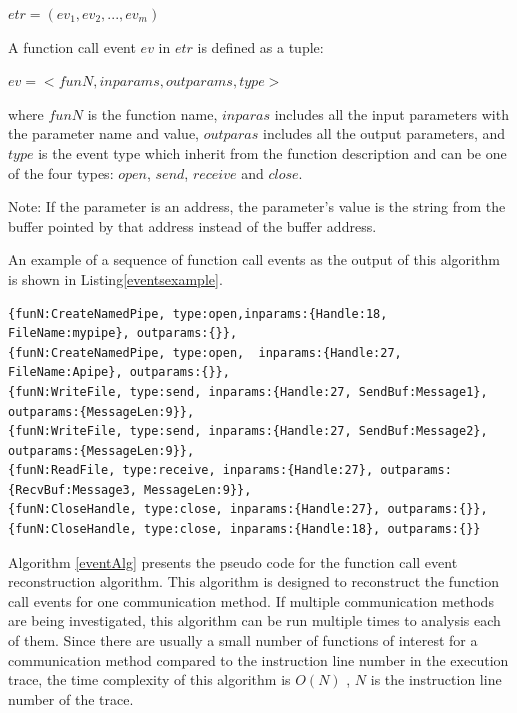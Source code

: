 $etr = (ev_1, ev_2, ..., ev_m)$

A function call event $ev$ in $etr$ is defined as a tuple:

$ev = <funN, inparams, outparams, type>$

where $funN$ is the function name, $inparas$ includes all the input parameters with the parameter name and value, $outparas$ includes all the output parameters, and $type$ is the event type which inherit from the function description and can be one of the four types: $open$, $send$, $receive$ and $close$.

Note: If the parameter is an address, the parameter's value is the string from the buffer pointed by that address instead of the buffer address.

An example of a sequence of function call events as the output of this algorithm is shown in Listing\ref{eventsexample}.

\begin{lstlisting}[caption= Example of  $etr$, label=eventsexample]
{funN:CreateNamedPipe, type:open,inparams:{Handle:18, FileName:mypipe}, outparams:{}},
{funN:CreateNamedPipe, type:open,  inparams:{Handle:27,  FileName:Apipe}, outparams:{}},
{funN:WriteFile, type:send, inparams:{Handle:27, SendBuf:Message1}, outparams:{MessageLen:9}},
{funN:WriteFile, type:send, inparams:{Handle:27, SendBuf:Message2}, outparams:{MessageLen:9}},
{funN:ReadFile, type:receive, inparams:{Handle:27}, outparams:{RecvBuf:Message3, MessageLen:9}},
{funN:CloseHandle, type:close, inparams:{Handle:27}, outparams:{}},
{funN:CloseHandle, type:close, inparams:{Handle:18}, outparams:{}}
\end{lstlisting}

Algorithm \ref{eventAlg} presents the pseudo code for the function call event reconstruction algorithm. This algorithm is designed to reconstruct the function call events for one communication method. If multiple communication methods are being investigated, this algorithm can be run multiple times to analysis each of them. Since there are usually a small number of functions of interest for a communication method compared to the instruction line number in the execution trace, the time complexity of this algorithm is $O(N)$ , $N$ is the instruction line number of the trace. 


